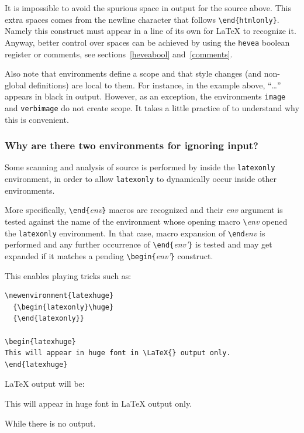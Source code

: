 It is impossible to avoid the spurious space in \hevea{} output
for the source above.
This extra spaces comes from the newline character that follows
\verb+\end{htmlonly}+. Namely this
construct must appear in a line of its own for
\LaTeX{} to recognize it. Anyway, better control over spaces
can be achieved
by using the \texttt{hevea} boolean register
or comments, see sections~\ref{heveabool}
and~\ref{comments}.

Also note that environments define a scope and that style changes
(and non-global definitions) are local to them. For instance, in the
example above, ``\ldots'' appears in black in \html{} output.
However, as an exception, the environments \texttt{image}
and \texttt{verbimage} do not create scope.
It takes a little practice of \hevea{} to understand why this is
convenient.





\subsubsection{Why are there two environments for ignoring input?}\label{why}
Some scanning and analysis of source is performed
by \hevea{} inside the \texttt{latexonly} environment, in order to
allow  \texttt{latexonly} to dynamically occur inside other environments.

More specifically, \verb+\end{+\textit{env}\verb+}+ macros
are recognized and their \textit{env} argument is tested against
the name of the environment whose opening macro \verb+\+\textit{env}
opened the \texttt{latexonly} environment.
In that case, macro expansion of \verb+\end+\textit{env} is performed and
any further occurrence of  \verb+\end{+\textit{env'}\verb+}+ is tested
and may get expanded if it matches a pending
\verb+\begin{+\textit{env'}\verb+}+
construct.


This enables playing tricks such as:
\begin{verbatim}
\newenvironment{latexhuge}
  {\begin{latexonly}\huge}
  {\end{latexonly}}

\begin{latexhuge}
This will appear in huge font in \LaTeX{} output only.
\end{latexhuge}
\end{verbatim}
\LaTeX{} output will be:
\begin{latexout}
\begin{showlatex}
\newenvironment{latexhuge}
  {\begin{latexonly}\huge}
  {\end{latexonly}}
\begin{latexhuge}
This  will appear in huge font in \LaTeX{} output only.
\end{latexhuge}
\end{showlatex}
\end{latexout}
\noindent While there is no \hevea{} output.

